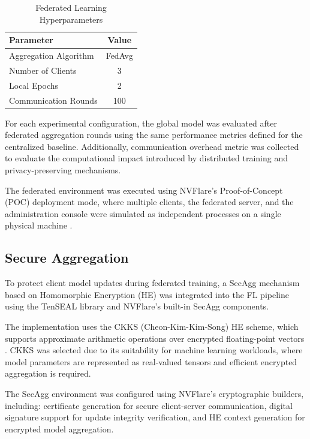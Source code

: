 \documentclass[conference]{IEEEtran}
\begin{document}
\begin{table}[h]
    \centering
    \renewcommand{\arraystretch}{1.3}
    \begin{tabular}{|l|c|}
        \hline
        \textbf{Parameter} & \textbf{Value} \\ \hline
        Aggregation Algorithm & FedAvg \\ \hline
        Number of Clients & 3 \\ \hline
        Local Epochs & 2 \\ \hline
        Communication Rounds & 100 \\ \hline
    \end{tabular}
    \caption{Federated Learning Hyperparameters}
    \label{tab:fed_hyperparameters}
\end{table}

For each experimental configuration, the global model was evaluated after federated aggregation rounds using the same performance metrics defined for the centralized baseline. Additionally, communication overhead metric was collected to evaluate the computational impact introduced by distributed training and privacy-preserving mechanisms.

The federated environment was executed using NVFlare’s Proof-of-Concept (POC) deployment mode, where multiple clients, the federated server, and the administration console were simulated as independent processes on a single physical machine \cite{nvflare_poc_doc}.

\subsection{Secure Aggregation}
\label{subsec:secure_aggregation}

To protect client model updates during federated training, a SecAgg mechanism based on Homomorphic Encryption (HE) was integrated into the FL pipeline using the TenSEAL library and NVFlare's built-in SecAgg components.

The implementation uses the CKKS (Cheon-Kim-Kim-Song) HE scheme, which supports approximate arithmetic operations over encrypted floating-point vectors \cite{cheon2017}. CKKS was selected due to its suitability for machine learning workloads, where model parameters are represented as real-valued tensors and efficient encrypted aggregation is required.

The SecAgg environment was configured using NVFlare's cryptographic builders, including: certificate generation for secure client-server communication, digital signature support for update integrity verification, and HE context generation for encrypted model aggregation.
\end{document}
